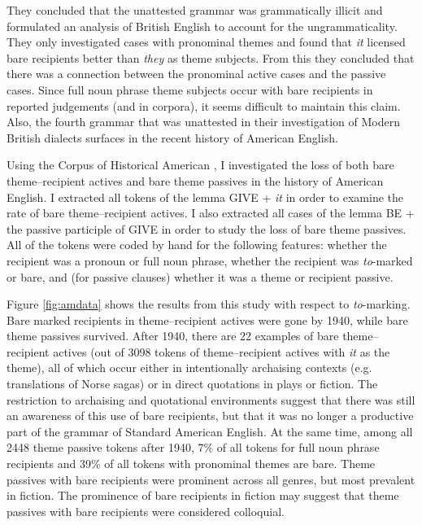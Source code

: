 {They concluded that the unattested grammar was grammatically illicit and formulated an analysis of British English to account for the ungrammaticality. They only investigated cases with pronominal themes and found that \textit{it} licensed bare recipients better than \textit{they} as theme subjects. From this they concluded that there was a connection between the pronominal active cases and the passive cases. Since full noun phrase theme subjects occur with bare recipients in reported judgements (and in corpora), it seems difficult to maintain this claim. Also, the fourth grammar that was unattested in their investigation of Modern British dialects surfaces in the recent history of American English.

Using the Corpus of Historical American \citep{Davies.2010}, I investigated the loss of both bare theme--recipient actives and bare theme passives in the history of American English. I extracted all tokens of the lemma GIVE + \textit{it} in order to examine the rate of bare theme--recipient actives. I also extracted all cases of the lemma BE + the passive participle of GIVE in order to study the loss of bare theme passives. All of the tokens were coded by hand for the following features: whether the recipient was a pronoun or full noun phrase, whether the recipient was \textit{to}-marked or bare, and (for passive clauses) whether it was a theme or recipient passive.



Figure \ref{fig:amdata} shows the results from this study with respect to \textit{to}-marking. Bare marked recipients in theme--recipient actives were gone by 1940, while bare theme passives survived. After 1940, there are 22 examples of bare theme--recipient actives (out of 3098 tokens of theme--recipient actives with \textit{it} as the theme), all of which occur either in intentionally archaising contexts (e.g. translations of Norse sagas) or in direct quotations in plays or fiction. The restriction to archaising and quotational environments suggest that there was still an awareness of this use of bare recipients, but that it was no longer a productive part of the grammar of Standard American English. At the same time, among all 2448 theme passive tokens after 1940, 7\% of all tokens for full noun phrase recipients and 39\% of all tokens with pronominal themes are bare. Theme passives with bare recipients were prominent across all genres, but most prevalent in fiction. The prominence of bare recipients in fiction may suggest that theme passives with bare recipients were considered colloquial.

}
